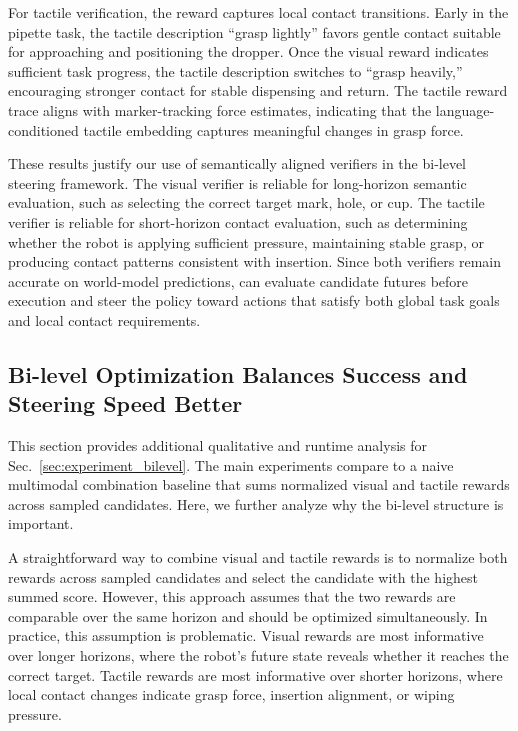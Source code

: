 For tactile verification, the reward captures local contact transitions. Early in the pipette task, the tactile description ``grasp lightly'' favors gentle contact suitable for approaching and positioning the dropper. Once the visual reward indicates sufficient task progress, the tactile description switches to ``grasp heavily,'' encouraging stronger contact for stable dispensing and return. The tactile reward trace aligns with marker-tracking force estimates, indicating that the language-conditioned tactile embedding captures meaningful changes in grasp force.

These results justify our use of semantically aligned verifiers in the bi-level steering framework. The visual verifier is reliable for long-horizon semantic evaluation, such as selecting the correct target mark, hole, or cup. The tactile verifier is reliable for short-horizon contact evaluation, such as determining whether the robot is applying sufficient pressure, maintaining stable grasp, or producing contact patterns consistent with insertion. Since both verifiers remain accurate on world-model predictions, \ours{} can evaluate candidate futures before execution and steer the policy toward actions that satisfy both global task goals and local contact requirements.


\subsection{Bi-level Optimization Balances Success and Steering Speed Better}
\label{app:results_bi_level}

This section provides additional qualitative and runtime analysis for Sec.~\ref{sec:experiment_bilevel}. The main experiments compare \ours{} to a naive multimodal combination baseline that sums normalized visual and tactile rewards across sampled candidates. Here, we further analyze why the bi-level structure is important.

A straightforward way to combine visual and tactile rewards is to normalize both rewards across sampled candidates and select the candidate with the highest summed score. However, this approach assumes that the two rewards are comparable over the same horizon and should be optimized simultaneously. In practice, this assumption is problematic. Visual rewards are most informative over longer horizons, where the robot's future state reveals whether it reaches the correct target. Tactile rewards are most informative over shorter horizons, where local contact changes indicate grasp force, insertion alignment, or wiping pressure. 

